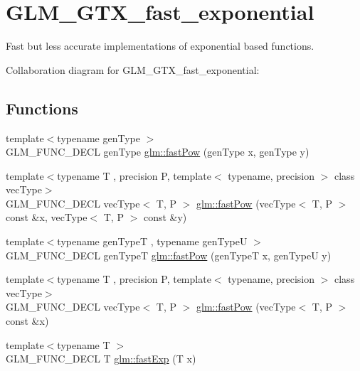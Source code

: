 \hypertarget{group__gtx__fast__exponential}{\section{G\-L\-M\-\_\-\-G\-T\-X\-\_\-fast\-\_\-exponential}
\label{group__gtx__fast__exponential}
}


Fast but less accurate implementations of exponential based functions.  


Collaboration diagram for G\-L\-M\-\_\-\-G\-T\-X\-\_\-fast\-\_\-exponential\-:
\subsection*{Functions}
\begin{DoxyCompactItemize}
\item 
{\footnotesize template$<$typename gen\-Type $>$ }\\G\-L\-M\-\_\-\-F\-U\-N\-C\-\_\-\-D\-E\-C\-L gen\-Type \hyperlink{group__gtx__fast__exponential_ga5340e98a11fcbbd936ba6e983a154d50}{glm\-::fast\-Pow} (gen\-Type x, gen\-Type y)
\item 
{\footnotesize template$<$typename T , precision P, template$<$ typename, precision $>$ class vec\-Type$>$ }\\G\-L\-M\-\_\-\-F\-U\-N\-C\-\_\-\-D\-E\-C\-L vec\-Type$<$ T, P $>$ \hyperlink{group__gtx__fast__exponential_ga07b73976a9af4005945bc338b45d8466}{glm\-::fast\-Pow} (vec\-Type$<$ T, P $>$ const \&x, vec\-Type$<$ T, P $>$ const \&y)
\item 
{\footnotesize template$<$typename gen\-Type\-T , typename gen\-Type\-U $>$ }\\G\-L\-M\-\_\-\-F\-U\-N\-C\-\_\-\-D\-E\-C\-L gen\-Type\-T \hyperlink{group__gtx__fast__exponential_ga7f2562db9c3e02ae76169c36b086c3f6}{glm\-::fast\-Pow} (gen\-Type\-T x, gen\-Type\-U y)
\item 
{\footnotesize template$<$typename T , precision P, template$<$ typename, precision $>$ class vec\-Type$>$ }\\G\-L\-M\-\_\-\-F\-U\-N\-C\-\_\-\-D\-E\-C\-L vec\-Type$<$ T, P $>$ \hyperlink{group__gtx__fast__exponential_ga29924aea1aa11c5c504fb2d621221906}{glm\-::fast\-Pow} (vec\-Type$<$ T, P $>$ const \&x)
\item 
{\footnotesize template$<$typename T $>$ }\\G\-L\-M\-\_\-\-F\-U\-N\-C\-\_\-\-D\-E\-C\-L T \hyperlink{group__gtx__fast__exponential_gaa3180ac8f96ab37ab96e0cacaf608e10}{glm\-::fast\-Exp} (T x)

\end{DoxyCompactItemize}

